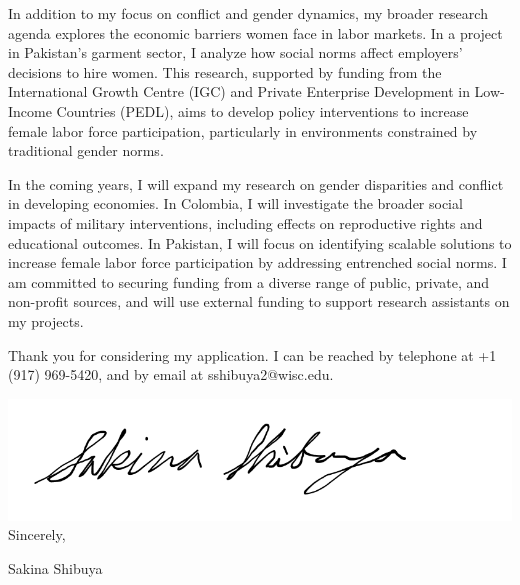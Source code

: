 \documentclass[12pt]{letter}
\begin{document}
In addition to my focus on conflict and gender dynamics, my broader research agenda explores the economic barriers women face in labor markets. 
In a project in Pakistan's garment sector, I analyze how social norms affect employers' decisions 
to hire women. This research, supported by funding from the International Growth Centre (IGC) and Private Enterprise Development in Low-Income Countries (PEDL), 
aims to develop policy interventions to increase female labor force participation, particularly in environments constrained by traditional gender norms.

In the coming years, I will expand my research on gender disparities and conflict in developing economies. 
In Colombia, I will investigate the broader social impacts of military interventions, including effects on reproductive rights and educational outcomes. 
In Pakistan, I will focus on identifying scalable solutions to increase female labor force participation by addressing entrenched social norms. 
I am committed to securing funding from a diverse range of public, private, and non-profit sources, and 
will use external funding to support research assistants on my projects.

Thank you for considering my application. 
I can be reached by telephone at +1 (917) 969-5420, and by email at sshibuya2@wisc.edu.

\bigskip

\includegraphics[height=4\baselineskip]{signature.png}  \\

\vspace*{-6.5\baselineskip}Sincerely, 

\vspace{2.5\baselineskip}Sakina Shibuya
\end{document}
